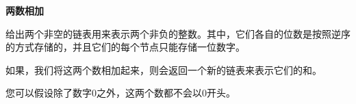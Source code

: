 \textbf{两数相加}\par

给出两个非空的链表用来表示两个非负的整数。其中，它们各自的位数是按照逆序的方式存储的，并且它们的每个节点只能存储一位数字。\par

如果，我们将这两个数相加起来，则会返回一个新的链表来表示它们的和。\par

您可以假设除了数字0之外，这两个数都不会以0开头。\par
